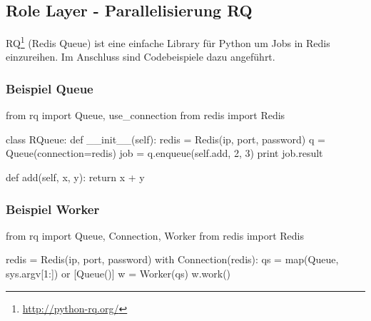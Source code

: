 \subsection{Role Layer - Parallelisierung RQ}
\Gls{RQ}\footnote{\url{http://python-rq.org/}} (Redis Queue) ist eine einfache Library für Python um Jobs in Redis einzureihen. Im Anschluss sind Codebeispiele dazu angeführt.

\subsubsection{Beispiel Queue}
\begin{python}
from rq import Queue, use_connection
from redis import Redis

class RQueue:
   def __init__(self):
       redis = Redis(ip, port, password)
       q = Queue(connection=redis)
       job = q.enqueue(self.add, 2, 3)
       print job.result

   def add(self, x, y):
       return x + y
\end{python}

\subsubsection{Beispiel Worker}
\begin{python}
from rq import Queue, Connection, Worker
from redis import Redis

redis = Redis(ip, port, password)
with Connection(redis):
   qs = map(Queue, sys.argv[1:]) or [Queue()]
   w = Worker(qs)
   w.work()
\end{python}
\newpage